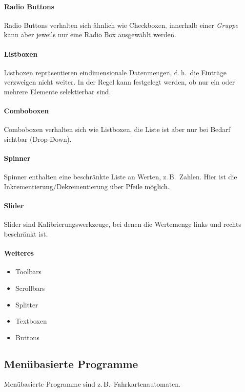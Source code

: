 \documentclass[a4paper, 11pt, accentcolor = tud3b]{tudreport}
\renewcommand{\dh}{d.\,h.~}
\newcommand{\zB}{z.\,B.~}
\begin{document}
					\paragraph{Radio Buttons}
						Radio Buttons verhalten sich ähnlich wie Checkboxen, innerhalb einer \emph{Gruppe} kann aber jeweils nur eine Radio Box ausgewählt werden.

					\paragraph{Listboxen}
						Listboxen repräsentieren eindimensionale Datenmengen, \dh die Einträge verzweigen nicht weiter. In der Regel kann festgelegt werden, ob nur ein oder mehrere Elemente selektierbar sind.

					\paragraph{Comboboxen}
						Comboboxen verhalten sich wie Listboxen, die Liste ist aber nur bei Bedarf sichtbar (Drop-Down).

					\paragraph{Spinner}
						Spinner enthalten eine beschränkte Liste an Werten, \zB Zahlen. Hier ist die Inkrementierung/Dekrementierung über Pfeile möglich.

					\paragraph{Slider}
						Slider sind Kalibrierungswerkzeuge, bei denen die Wertemenge links und rechts beschränkt ist.

					\paragraph{Weiteres}
						\begin{itemize}
							\item Toolbars
							\item Scrollbars
							\item Splitter
							\item Textboxen
							\item Buttons
						\end{itemize}

			\subsection{Menübasierte Programme}
				Menübasierte Programme sind \zB Fahrkartenautomaten.
\end{document}
